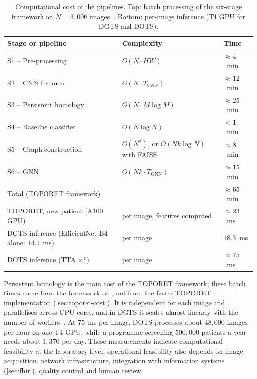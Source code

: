 \begin{table}[!htbp]
\centering
\caption[Computational cost of the pipelines]{Computational cost of the pipelines. Top:
batch processing of the six-stage framework on $N=3{,}000$ images~\cite{belhadj2026enase}.
Bottom: per-image inference (T4 GPU for DGTS and DOTS).}
\label{tab:latency}
\small
\begin{tabular}{@{}P{6.4cm} P{5.2cm} l@{}}
\toprule
Stage or pipeline & Complexity & Time \\
\midrule
S1 -- Pre-processing & $O(N\cdot HW)$ & $\approx4$~min \\
S2 -- CNN features & $O(N\cdot T_{\mathrm{CNN}})$ & $\approx12$~min \\
S3 -- Persistent homology & $O(N\cdot M\log M)$ & $\approx25$~min \\
S4 -- Baseline classifier & $O(N\log N)$ & $<1$~min \\
S5 -- Graph construction & $O(N^2)$, or $O(Nk\log N)$ with FAISS & $\approx8$~min \\
S6 -- GNN & $O(Nk\cdot T_{\mathrm{GNN}})$ & $\approx15$~min \\
Total (TOPORET framework) & & $\approx65$~min \\
\midrule
TOPORET, new patient (A100 GPU)~\cite{belhadj2025plos} & per image, features computed & $\approx23$~ms \\
DGTS inference (EfficientNet-B4 alone: $14.1$~ms) & per image & $18.3$~ms \\
DOTS inference (TTA $\times5$) & per image & $\approx75$~ms \\
\bottomrule
\end{tabular}
\end{table}

Persistent homology is the main cost of the TOPORET framework; these batch times come
from the framework of~\cite{belhadj2026enase}, not from the faster TOPORET implementation
(\cref{sec:toporet-cost}). It is independent for each image and parallelises across CPU cores, and in DGTS it scales almost linearly with the
number of workers~\cite{belhadj2026dgts}. At $75$~ms per image, DOTS processes about
$48{,}000$ images per hour on one T4 GPU, while a programme screening $500{,}000$ patients a
year needs about $1{,}370$ per day. These measurements indicate computational feasibility
at the laboratory level; operational feasibility also depends on image acquisition,
network infrastructure, integration with information systems (\cref{sec:fhir}), quality
control and human review.

